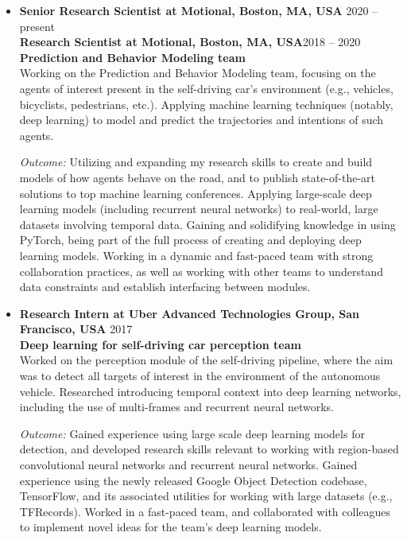 \documentclass[10pt,letterpaper]{article}
\newcommand{\thing}[2]{{#1} \hfill {#2}}
\begin{document}
\begin{itemize}%

\item \thing{\bf Senior Research Scientist at Motional, Boston, MA, USA}{2020 -- present}\\
 	{\bf Research Scientist at Motional, Boston, MA, USA}\hfill{2018  --  \hspace{2.8mm} 2020}\vspace{0.5em}\\
	{\bf Prediction and Behavior Modeling team}\vspace{0.5em}\\
      	Working on the Prediction and Behavior Modeling team, focusing on the agents of interest present in the self-driving car's environment (e.g., vehicles, bicyclists, pedestrians, etc.). Applying machine learning techniques (notably, deep learning) to model and predict the trajectories and intentions of such agents.
	
	{\it Outcome:} Utilizing and expanding my research skills to create and build models of how agents behave on the road, and to publish state-of-the-art solutions to top machine learning conferences. Applying large-scale deep learning models (including recurrent neural networks) to real-world, large datasets involving temporal data. Gaining and solidifying knowledge in using PyTorch, being part of the full process of creating and deploying deep learning models. Working in a dynamic and fast-paced team with strong collaboration practices, as well as working with other teams to understand data constraints and establish interfacing between modules.
	
\item \thing{\bf Research Intern at Uber Advanced Technologies Group, San Francisco, USA}{2017}\\
        {\bf Deep learning for self-driving car perception team}\vspace{0.5em}\\
        Worked on the perception module of the self-driving pipeline, where the aim was to detect all targets of interest in the environment of the autonomous vehicle. Researched introducing temporal context into deep learning networks, including the use of multi-frames and recurrent neural networks.
	
	{\it Outcome:} Gained experience using large scale deep learning models for detection, and developed research skills relevant to working with region-based convolutional neural networks and recurrent neural networks. Gained experience using the newly released Google Object Detection codebase, TensorFlow, and its associated utilities for working with large datasets (e.g., TFRecords). Worked in a fast-paced team, and collaborated with colleagues to implement novel ideas for the team's deep learning models.
		

\end{itemize}
\end{document}
